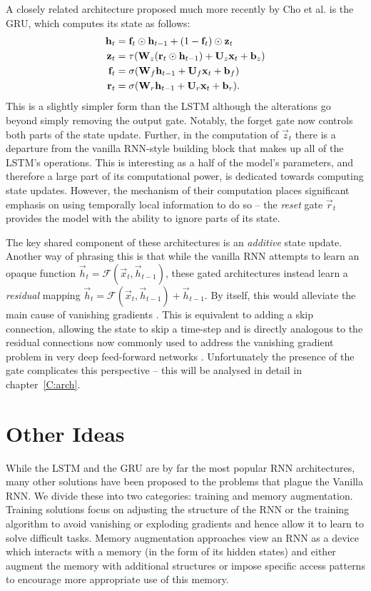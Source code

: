 A closely related architecture proposed much more recently by Cho et al. \autocite{Cho2014} is the
GRU, which computes its state as follows:
\begin{align}\label{eq:GRU}
	\mathbf{h}_t &= \mathbf{f}_t \odot \mathbf{h}_{t-1} + (1 - \mathbf{f}_t)\odot\mathbf{z}_t\\
	\mathbf{z}_t &= \tau(\mathbf{W}_z(\mathbf{r}_t \odot \mathbf{h}_{t-1}) + \mathbf{U}_z\mathbf{x}_t + \mathbf{b}_z)\\
	\mathbf{f}_t &= \sigma(\mathbf{W}_f\mathbf{h}_{t-1} + \mathbf{U}_f\mathbf{x}_t + \mathbf{b}_f)\\
	\mathbf{r}_t &= \sigma(\mathbf{W}_r\mathbf{h}_{t-1} + \mathbf{U}_r\mathbf{x}_t + \mathbf{b}_r).
\end{align} This is a slightly simpler form than the LSTM although the alterations go beyond
simply removing the output gate. Notably, the forget gate now controls both parts of the state
update. Further, in the computation of \(\vec{z}_t\) there is a departure from the vanilla
RNN-style building block that makes up all of the LSTM's operations. This is interesting as a
half of the model's parameters, and therefore a large part of its computational power, is
dedicated towards computing state updates. However, the mechanism of their computation places
significant emphasis on using temporally local information to do so -- the \emph{reset} gate
\(\vec{r}_t\) provides the model with the ability to ignore parts of its state.

The key shared component of these architectures is an \emph{additive} state update. Another way
of phrasing this is that while the vanilla RNN attempts to learn an opaque function
\(\vec{h}_t = \mathcal{F}(\vec{x}_t, \vec{h}_{t-1})\), these gated architectures instead learn
a \emph{residual} mapping \(\vec{h}_t = \mathcal{F}(\vec{x}_t, \vec{h}_{t-1}) + \vec{h}_{t-1}\).
By itself, this would alleviate the main cause of vanishing gradients 
\autocite{Jozefowicz2015, Hochreiter1997}. This is equivalent to adding a skip connection,
allowing the state to skip a time-step and is directly analogous to the residual connections
now commonly used to address the vanishing gradient problem in very deep feed-forward networks
\autocite{He2015, Duvenaud2014, Szegedy2016}. Unfortunately the presence of the gate complicates
this perspective -- this will be analysed in detail in chapter~\ref{C:arch}.


\section{Other Ideas}
While the LSTM and the GRU are by far the most popular RNN architectures, many other solutions
have been proposed to the problems that plague the Vanilla RNN. We divide these into two categories:
training and memory augmentation. Training solutions focus on adjusting the structure of the RNN or
the training algorithm to avoid vanishing or exploding gradients and hence allow it to learn to solve
difficult tasks. Memory augmentation approaches view an RNN as a device which interacts with a
memory (in the form of its hidden states) and either augment the memory with additional
structures or impose specific access patterns to encourage more appropriate use of this memory.

